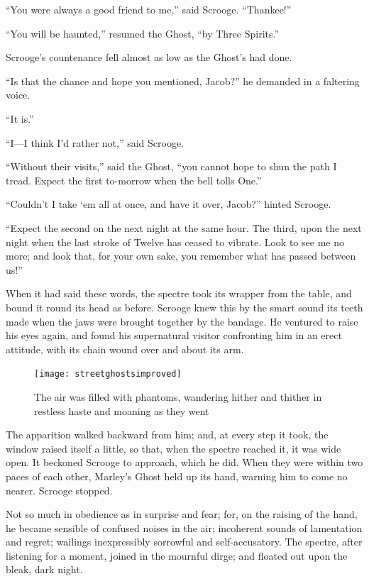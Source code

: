 \documentclass[paper=5.5in:8.5in,BCOR=15mm,twoside,DIV=15,headinclude=off,12pt,chapterprefix=off,openany,headings=huge]{scrbook} %
\begin{document}
\enquote{You were always a good friend to me,} said Scrooge. \enquote{Thankee!}

\enquote{You will be haunted,} resumed the Ghost, \enquote{by Three Spirits.}

Scrooge's countenance fell almost as low as the Ghost's had done.

\enquote{Is that the chance and hope you mentioned, Jacob?} he demanded in a faltering voice.

\enquote{It is.}

\enquote{I—I think I'd rather not,} said Scrooge.

\enquote{Without their visits,} said the Ghost, \enquote{you cannot hope to shun the path I tread. Expect the first to-morrow when the bell tolls One.}

\enquote{Couldn't I take `em all at once, and have it over, Jacob?} hinted Scrooge.

\enquote{Expect the second on the next night at the same hour. The third, upon the next night when the last stroke of Twelve has ceased to vibrate. Look to see me no more; and look that, for your own sake, you remember what has passed between us!}

When it had said these words, the spectre took its wrapper from the table, and bound it round its head as before. Scrooge knew this by the smart sound its teeth made when the jaws were brought together by the bandage. He ventured to raise his eyes again, and found his supernatural visitor confronting him in an erect attitude, with its chain wound over and about its arm.

\begin{figure}[p]
\begin{minipage}[c]{\linewidth}
\texttt{[image: streetghostsimproved]}
\caption*{The air was filled with phantoms, wandering hither and thither in restless haste and moaning as they went}
\end{minipage}
\end{figure}

The apparition walked backward from him; and, at every step it took, the window raised itself a little, so that, when the spectre reached it, it was wide open. It beckoned Scrooge to approach, which he did. When they were within two paces of each other, Marley's Ghost held up its hand, warning him to come no nearer. Scrooge stopped.

Not so much in obedience as in surprise and fear; for, on the raising of the hand, he became sensible of confused noises in the air; incoherent sounds of lamentation and regret; wailings inexpressibly sorrowful and self-accusatory. The spectre, after listening for a moment, joined in the mournful dirge; and floated out upon the bleak, dark night.
\end{document}
